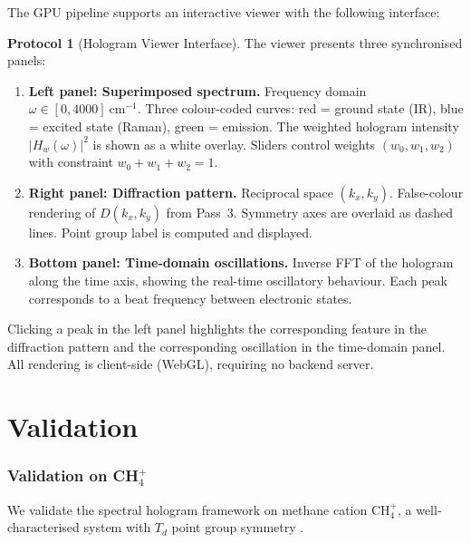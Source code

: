 \documentclass[11pt,twocolumn,a4paper]{article}
\theoremstyle{definition}
\newtheorem{protocol}[theorem]{Protocol}
\theoremstyle{remark}
\begin{document}
The GPU pipeline supports an interactive viewer with the following interface:

\begin{protocol}[Hologram Viewer Interface]
\label{prot:viewer}
The viewer presents three synchronised panels:
\begin{enumerate}[label=(\alph*)]
  \item \textbf{Left panel: Superimposed spectrum.} Frequency domain $\omega \in [0, 4000]~\mathrm{cm}^{-1}$. Three colour-coded curves: red = ground state (IR), blue = excited state (Raman), green = emission. The weighted hologram intensity $|H_w(\omega)|^2$ is shown as a white overlay. Sliders control weights $(w_0, w_1, w_2)$ with constraint $w_0 + w_1 + w_2 = 1$.
  \item \textbf{Right panel: Diffraction pattern.} Reciprocal space $(k_x, k_y)$. False-colour rendering of $D(k_x, k_y)$ from Pass~3. Symmetry axes are overlaid as dashed lines. Point group label is computed and displayed.
  \item \textbf{Bottom panel: Time-domain oscillations.} Inverse FFT of the hologram along the time axis, showing the real-time oscillatory behaviour. Each peak corresponds to a beat frequency between electronic states.
\end{enumerate}
Clicking a peak in the left panel highlights the corresponding feature in the diffraction pattern and the corresponding oscillation in the time-domain panel. All rendering is client-side (WebGL), requiring no backend server.
\end{protocol}


\part{Validation}

\section{Validation on CH$_4^+$}
\label{sec:ch4}

We validate the spectral hologram framework on methane cation CH$_4^+$, a well-characterised system with $T_d$ point group symmetry \citep{oka1980}.
\end{document}

